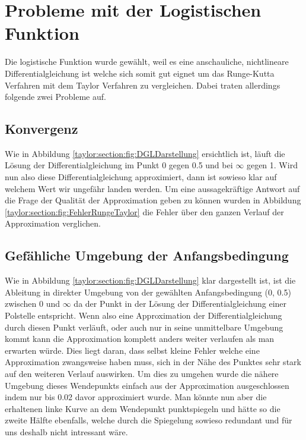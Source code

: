 \section{Probleme mit der Logistischen Funktion}
\label{taylor:subsection:Probleme}
Die logistische Funktion wurde gewählt, weil es eine anschauliche, nichtlineare Differentialgleichung ist welche sich somit gut eignet um das Runge-Kutta Verfahren mit dem Taylor Verfahren zu vergleichen.
Dabei traten allerdings folgende zwei Probleme auf.

\subsection{Konvergenz}
\label{taylor:subsection:Konvergenz}
Wie in Abbildung 
\ref{taylor:section:fig:DGLDarstellung}
ersichtlich ist, läuft die Lösung der Differentialgleichung im Punkt 0 gegen 0.5 und bei $\infty$ gegen 1.
Wird nun also diese Differentialgleichung approximiert, dann ist sowieso klar auf welchem Wert wir ungefähr landen werden.
Um eine aussagekräftige Antwort auf die Frage der Qualität der Approximation geben zu können wurden in Abbildung \ref{taylor:section:fig:FehlerRungeTaylor} die Fehler über den ganzen Verlauf der Approximation verglichen.

\subsection{Gefähliche Umgebung der Anfangsbedingung}
\label{taylor:subsection:0Punkt}
Wie in Abbildung 
\ref{taylor:section:fig:DGLDarstellung}
klar dargestellt ist, ist die Ableitung in direkter Umgebung von der gewählten Anfangsbedingung (0, 0.5) zwischen 0 und $\infty$ da der Punkt in der Lösung der Differentialgleichung einer Polstelle entspricht.
Wenn also eine Approximation der Differentialgleichung durch diesen Punkt verläuft, oder auch nur in seine unmittelbare Umgebung kommt kann die Approximation komplett anders weiter verlaufen als man erwarten würde.
Dies liegt daran, dass selbst kleine Fehler welche eine Approximation zwangsweise haben muss, sich in der Nähe des Punktes sehr stark auf den weiteren Verlauf auswirken.
Um dies zu umgehen wurde die nähere Umgebung dieses Wendepunkts einfach aus der Approximation ausgeschlossen indem nur bis 0.02 davor approximiert wurde.
Man könnte nun aber die erhaltenen linke Kurve an dem Wendepunkt punktspiegeln und hätte so die zweite Hälfte ebenfalls, welche durch die Spiegelung sowieso redundant und für uns deshalb nicht intressant wäre.



